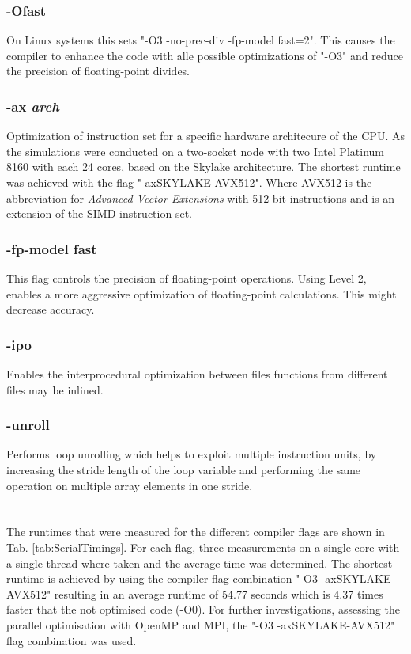 \documentclass[a4paper, 11pt, oneside]{scrartcl}
\newcommand{\refTab}[1]{Tab. \ref{#1}}
\begin{document}
\subsubsection*{-Ofast}
On Linux systems this sets "-O3 -no-prec-div -fp-model fast=2". This causes the compiler to enhance the code with alle possible optimizations of "-O3" and reduce the precision of floating-point divides.

\subsubsection*{-ax \textit{arch}}
Optimization of instruction set for a specific hardware architecure of the CPU. As the simulations were conducted on a two-socket node with two Intel Platinum 8160 with each 24 cores, based on the Skylake architecture. The shortest runtime was achieved with the flag "-axSKYLAKE-AVX512". Where AVX512 is the abbreviation for \textit{Advanced Vector Extensions} with 512-bit instructions and is an extension of the SIMD instruction set. 

\subsubsection*{-fp-model fast}
This flag controls the precision of floating-point operations. Using Level 2, enables a more aggressive optimization of floating-point calculations. This might decrease accuracy.

\subsubsection*{-ipo}
Enables the interprocedural optimization between files functions from different files may be inlined.

\subsubsection*{-unroll}
Performs loop unrolling which helps to exploit multiple instruction units, by increasing the stride length of the loop variable and performing the same operation on multiple array elements in one stride. 
\\
\citep{anmeyRWTHHPCClusterUser, behrLectureParallelComputing, QuickReferenceGuide, IntelCompilerClassic2022}
\\
\\
The runtimes that were measured for the different compiler flags are shown in \refTab{tab:SerialTimings}. For each flag, three measurements on a single core with a single thread where taken and the average time was determined. The shortest runtime is achieved by using the compiler flag combination "-O3 -axSKYLAKE-AVX512" resulting in an average runtime of 54.77 seconds which is 4.37 times faster that the not optimised code (-O0). For further investigations, assessing the parallel optimisation with OpenMP and MPI, the "-O3 -axSKYLAKE-AVX512" flag combination was used.
\end{document}
